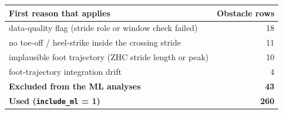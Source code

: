 \begin{tabular}{@{}p{9.5cm} r@{}}
\toprule
\textbf{First reason that applies} & \textbf{Obstacle rows} \\
\midrule
data-quality flag (stride role or window check failed) & 18 \\
no toe-off / heel-strike inside the crossing stride & 11 \\
implausible foot trajectory (ZHC stride length or peak) & 10 \\
foot-trajectory integration drift & 4 \\
\midrule
\textbf{Excluded from the ML analyses} & \textbf{43} \\
\textbf{Used (\texttt{include\_ml} = 1)} & \textbf{260} \\
\bottomrule
\end{tabular}
